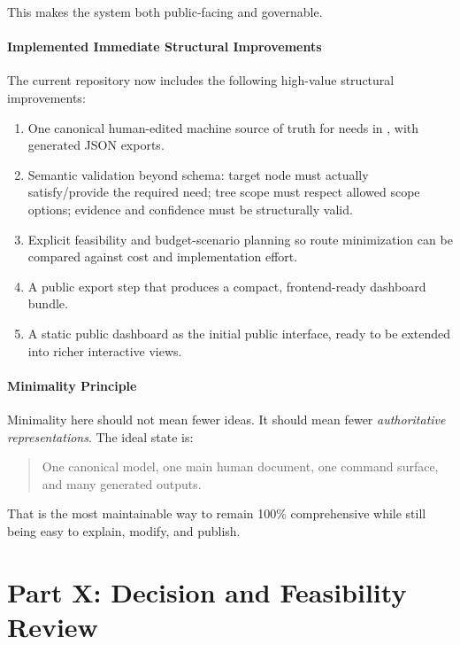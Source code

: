 \documentclass[11pt,a4paper]{article}
\begin{document}
This makes the system both public-facing and governable.

\subsection{Implemented Immediate Structural Improvements}

The current repository now includes the following high-value structural improvements:

\begin{enumerate}
    \item One canonical human-edited machine source of truth for needs in , with generated JSON exports.
    \item Semantic validation beyond schema: target node must actually satisfy/provide the required need; tree scope must respect 
    allowed scope options; evidence and confidence must be structurally valid.
    \item Explicit feasibility and budget-scenario planning so route minimization can be compared against cost and implementation effort.
    \item A public export step that produces a compact, frontend-ready dashboard bundle.
    \item A static public dashboard as the initial public interface, ready to be extended into richer interactive views.
\end{enumerate}

\subsection{Minimality Principle}

Minimality here should not mean fewer ideas. It should mean fewer \textit{authoritative representations}. The ideal state is:

\begin{quote}
One canonical model, one main human document, one command surface, and many generated outputs.
\end{quote}

That is the most maintainable way to remain 100\% comprehensive while still being easy to explain, modify, and publish.

\part{Part X: Decision and Feasibility Review}
\end{document}
